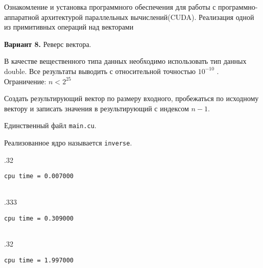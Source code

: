 \documentclass[12pt]{article}
\begin{document}


Ознакомление и установка программного обеспечения для
работы с программно-аппаратной архитектурой параллельных вычислений(CUDA).
Реализация одной из примитивных операций над векторами

\textbf{Вариант 8.} Реверс вектора.

В качестве вещественного типа данных необходимо использовать тип данных
double. Все результаты выводить с относительной точностью $10^{-10}$ . Ограничение:
$n < 2^{25}$

\nvidia

Создать результирующий вектор по размеру входного, пробежаться по исходному вектору
и записать значения в результирующий с индексом $n-1$.

Единственный файл \lstinline|main.cu|.

Реализованное ядро называется \lstinline|inverse|.


\begin{table*}[!htb]
	\begin{subtable}{.32\linewidth}
		\caption{1000 элементов}
		\centering

		\lstinline|cpu time = 0.007000|

		\begin{tabular}{|c|c|c|}

			\hline
		\end{tabular}
	\end{subtable}
	\begin{subtable}{.333\linewidth}
		\caption{100000 элементов}
		\centering

		\lstinline|cpu time = 0.309000|

		\begin{tabular}{|c|c|c|}

			\hline
		\end{tabular}
	\end{subtable}
	\begin{subtable}{.32\linewidth}
		\caption{1000000 элементов}
		\centering

		\lstinline|cpu time = 1.997000|

		\begin{tabular}{|c|c|c|}

			\hline
		\end{tabular}
	\end{subtable}

\end{table*}
\end{document}
